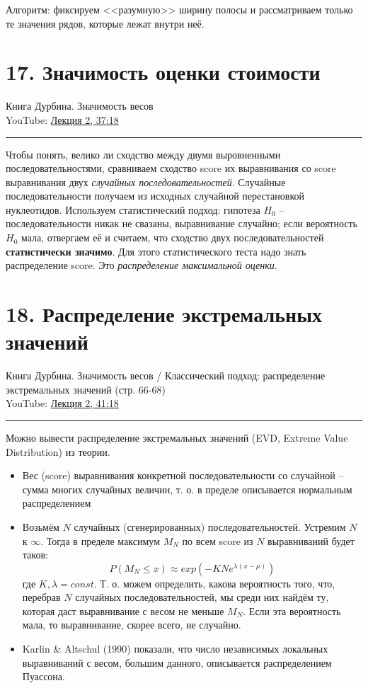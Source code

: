 \documentclass[a4paper,12pt]{article} %
\begin{document}
Алгоритм: фиксируем <<разумную>> ширину полосы и рассматриваем только те значения рядов, которые лежат внутри неё.


\section{17. Значимость оценки стоимости}
Книга Дурбина.  Значимость весов \\
YouTube: \href{https://youtu.be/gGoYQBBEX8M?t=2237}{Лекция 2, 37:18}
\hrule \vspace{10pt}

Чтобы понять, велико ли сходство между двумя выровненными последовательностями, сравниваем сходство score их выравнивания со score выравнивания двух \textit{случайных последовательностей}. Случайные последовательности получаем из исходных случайной перестановкой нуклеотидов. Используем статистический подход: гипотеза $H_0$ -- последовательности никак не свазаны, выравнивание случайно; если вероятность $H_0$ мала, отвергаем её и считаем, что сходство двух последовательностей \textbf{статистически значимо}. Для этого статистического теста надо знать распределение score. Это \textit{распределение максимальной оценки}.

\section{18. Распределение экстремальных значений}
Книга Дурбина.  Значимость весов / Классический подход: распределение экстремальных значений (стр. 66-68) \\
YouTube: \href{https://youtu.be/gGoYQBBEX8M?t=2478}{Лекция 2, 41:18}
\hrule \vspace{10pt}

Можно вывести распределение экстремальных значений (EVD, Extreme Value Distribution) из теории.
\begin{itemize}
	\item Вес (score) выравнивания конкретной последовательности со случайной -- сумма многих случайных величин, т. о. в пределе описывается нормальным распределением
	\item Возьмём $N$ случайных (сгенерированных) последовательностей. Устремим $N$ к $\infty$. Тогда в пределе максимум $M_N$ по всем score из $N$ выравниваний будет таков:
	$$P(M_N \le x) \approx exp(-KN e^{\lambda(x-\mu)})$$
	где $K, \lambda = const$. Т. о. можем определить, какова вероятность того, что, перебрав $N$ случайных последовательностей, мы среди них найдём ту, которая даст выравнивание с весом не меньше $M_N$. Если эта вероятность мала, то выравнивание, скорее всего, не случайно.
	\item Karlin \& Altschul (1990) показали, что число независимых локальных выравниваний с весом, большим данного, описывается распределением Пуассона.
\end{itemize}
\end{document}
